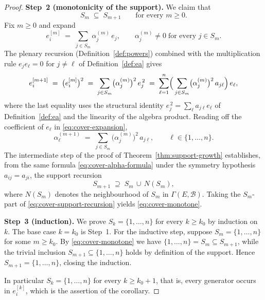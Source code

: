 \documentclass[12pt,a4paper]{amsart}
\theoremstyle{definition}
\newcommand{\EA}{E}          %
\newcommand{\natbasis}{\mathcal{B}}  %
\begin{document}
\begin{proof}
\medskip
\noindent\textbf{Step~2 (monotonicity of the support).}
We claim that
\begin{equation}\label{eq:cover-monotone}
  S_m\;\subseteq\;S_{m+1}
  \qquad\text{for every }m\ge 0.
\end{equation}
Fix $m\ge 0$ and expand
\[
  e_i^{[m]}\;=\;\sum_{j\in S_m}\alpha_j^{(m)}\,e_j,
  \qquad \alpha_j^{(m)}\ne 0\;\text{for every }j\in S_m.
\]
The plenary recursion (Definition~\ref{def:powers}) combined with the
multiplication rule $e_je_\ell=0$ for $j\ne\ell$ of
Definition~\ref{def:ea} gives
\begin{equation}\label{eq:cover-expansion}
  e_i^{[m+1]}
  \;=\;\bigl(e_i^{[m]}\bigr)^{2}
  \;=\;\sum_{j\in S_m}\bigl(\alpha_j^{(m)}\bigr)^{2}\,e_j^{\,2}
  \;=\;\sum_{\ell=1}^{n}
        \Bigl(\,\sum_{j\in S_m}\bigl(\alpha_j^{(m)}\bigr)^{2}\,a_{j\ell}\Bigr)\,e_\ell,
\end{equation}
where the last equality uses the structural identity
$e_j^{\,2}=\sum_{\ell}a_{j\ell}e_\ell$ of Definition~\ref{def:ea} and
the linearity of the algebra product.  Reading off the coefficient of
$e_\ell$ in \eqref{eq:cover-expansion},
\begin{equation}\label{eq:cover-alpha-formula}
  \alpha_\ell^{(m+1)}
  \;=\;\sum_{j\in S_m}\bigl(\alpha_j^{(m)}\bigr)^{2}\,a_{j\ell},
  \qquad
  \ell\in\{1,\ldots,n\}.
\end{equation}
The intermediate step of the proof of
Theorem~\ref{thm:support-growth} establishes, from the same formula
\eqref{eq:cover-alpha-formula} under the symmetry hypothesis
$a_{ij}=a_{ji}$, the support recursion
\begin{equation}\label{eq:cover-support-recursion}
  S_{m+1}\;\supseteq\;S_m\,\cup\,N(S_m),
\end{equation}
where $N(S_m)$ denotes the neighbourhood of $S_m$ in
$\varGamma(\EA,\natbasis)$.  Taking the $S_m$-part of
\eqref{eq:cover-support-recursion} yields
\eqref{eq:cover-monotone}.

\medskip
\noindent\textbf{Step~3 (induction).}
We prove $S_k=\{1,\ldots,n\}$ for every $k\ge k_0$ by induction on
$k$.  The base case $k=k_0$ is Step~1.  For the inductive step,
suppose $S_m=\{1,\ldots,n\}$ for some $m\ge k_0$.  By
\eqref{eq:cover-monotone} we have
$\{1,\ldots,n\}=S_m\subseteq S_{m+1}$, while the trivial inclusion
$S_{m+1}\subseteq\{1,\ldots,n\}$ holds by definition of the support.
Hence $S_{m+1}=\{1,\ldots,n\}$, closing the induction.

In particular $S_k=\{1,\ldots,n\}$ for every $k\ge k_0+1$, that is,
every generator occurs in $e_i^{[k]}$, which is the assertion of the
corollary.
\end{proof}
\end{document}
